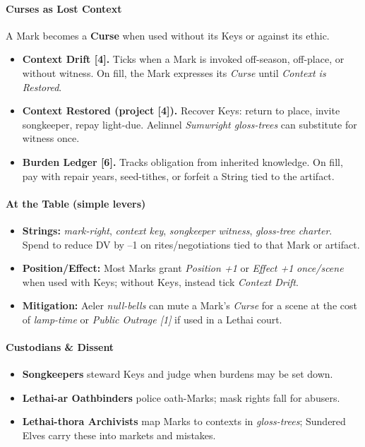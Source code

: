 \documentclass[11pt]{article}
\begin{document}
\paragraph{Curses as Lost Context}
A Mark becomes a \textbf{Curse} when used without its Keys or against its ethic.
\begin{itemize}[leftmargin=*]
  \item \textbf{Context Drift [4].} Ticks when a Mark is invoked off-season, off-place, or without witness. On fill, the Mark expresses its \emph{Curse} until \emph{Context is Restored}.
  \item \textbf{Context Restored (project [4]).} Recover Keys: return to place, invite songkeeper, repay light-due. Aelinnel \emph{Sumwright gloss-trees} can substitute for witness once.
  \item \textbf{Burden Ledger [6].} Tracks obligation from inherited knowledge. On fill, pay with repair years, seed-tithes, or forfeit a String tied to the artifact.
\end{itemize}

\paragraph{At the Table (simple levers)}
\begin{itemize}[leftmargin=*]
  \item \textbf{Strings:} \emph{mark-right}, \emph{context key}, \emph{songkeeper witness}, \emph{gloss-tree charter}. Spend to reduce DV by --1 on rites/negotiations tied to that Mark or artifact.
  \item \textbf{Position/Effect:} Most Marks grant \emph{Position +1} or \emph{Effect +1} \emph{once/scene} when used with Keys; without Keys, instead tick \emph{Context Drift}.
  \item \textbf{Mitigation:} Aeler \emph{null-bells} can mute a Mark's \emph{Curse} for a scene at the cost of \emph{lamp-time} or \emph{Public Outrage [1]} if used in a Lethai court.
\end{itemize}

\paragraph{Custodians \& Dissent}
\begin{itemize}[leftmargin=*]
  \item \textbf{Songkeepers} steward Keys and judge when burdens may be set down.
  \item \textbf{Lethai-ar Oathbinders} police oath-Marks; mask rights fall for abusers.
  \item \textbf{Lethai-thora Archivists} map Marks to contexts in \emph{gloss-trees}; Sundered Elves carry these into markets and mistakes.
\end{itemize}
\end{document}
